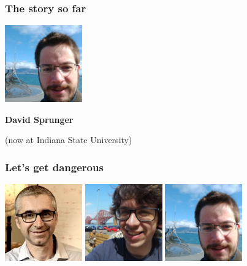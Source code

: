 \begin{frame}
    \frametitle{The story so far}

    \centering

    \includegraphics[width=0.25\textwidth]{imgs/sprunger}

    \LARGE
    \textbf{David Sprunger}

    \await
    \normalsize
    (now at Indiana State University)

\end{frame}

\begin{frame}
    \frametitle{Let's get dangerous}

    \centering

    \includegraphics[width=0.25\textwidth]{imgs/ghica}
    \includegraphics[width=0.25\textwidth]{imgs/kaye}
    \includegraphics[width=0.25\textwidth]{imgs/sprunger}

\end{frame}